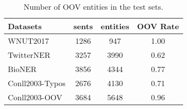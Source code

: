 \documentclass[11pt]{article}
\begin{document}
\begin{table}[t]
\begin{tabular}{lccc}
\hline
\hline
Datasets        & \multicolumn{1}{l}{sents} & \multicolumn{1}{l}{entities} & \multicolumn{1}{l}{OOV Rate} \\ \hline
WNUT2017        & 1286               &  947                   & 1.00                            \\ \hline
TwitterNER      & 3257              & 3990                  & 0.62                   \\ \hline
BioNER          & 3856              &  4344                 & 0.77                      \\ \hline
Conll2003-Typos & 2676                      & 4130                         & 0.71                      \\ \hline
Conll2003-OOV   & 3684                      & 5648                         & 0.96                      \\ \hline
     

\end{tabular}
\caption{Number of OOV entities in the test sets. }
\label{dataset}
\end{table}
\end{document}
